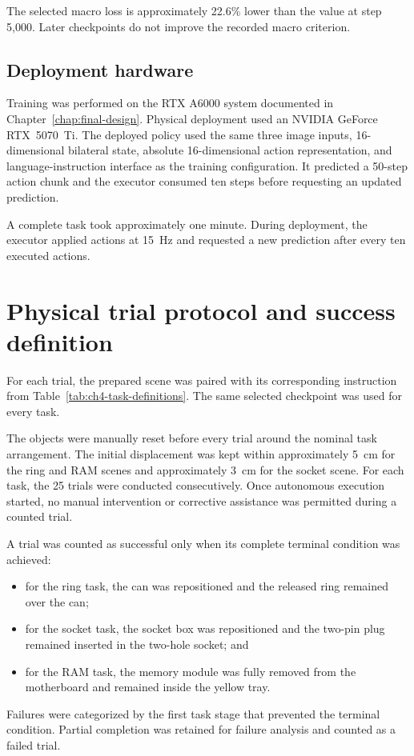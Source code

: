 The selected macro loss is approximately 22.6\% lower than the value at
step 5,000. Later checkpoints do not improve the recorded macro criterion.

\subsection{Deployment hardware}

Training was performed on the RTX A6000 system documented in Chapter~\ref{chap:final-design}. Physical deployment used an NVIDIA GeForce RTX~5070~Ti. The deployed policy used the same three image inputs, 16-dimensional bilateral state, absolute 16-dimensional action representation, and language-instruction interface as the training configuration. It predicted a 50-step action chunk and the executor consumed ten steps before requesting an updated prediction.

A complete task took approximately one minute. During deployment, the executor applied actions at 15~Hz and requested a new prediction after every ten executed actions.

\section{Physical trial protocol and success definition}

For each trial, the prepared scene was paired with its corresponding instruction from Table~\ref{tab:ch4-task-definitions}. The same selected checkpoint was used for every task.

The objects were manually reset before every trial around the nominal task arrangement. The initial displacement was kept within approximately 5~cm for the ring and RAM scenes and approximately 3~cm for the socket scene. For each task, the 25 trials were conducted consecutively. Once autonomous execution started, no manual intervention or corrective assistance was permitted during a counted trial.

A trial was counted as successful only when its complete terminal condition was achieved:
\begin{itemize}
  \item for the ring task, the can was repositioned and the released ring remained over the can;
  \item for the socket task, the socket box was repositioned and the two-pin plug remained inserted in the two-hole socket; and
  \item for the RAM task, the memory module was fully removed from the motherboard and remained inside the yellow tray.
\end{itemize}
Failures were categorized by the first task stage that prevented the terminal condition. Partial completion was retained for failure analysis and counted as a failed trial.


